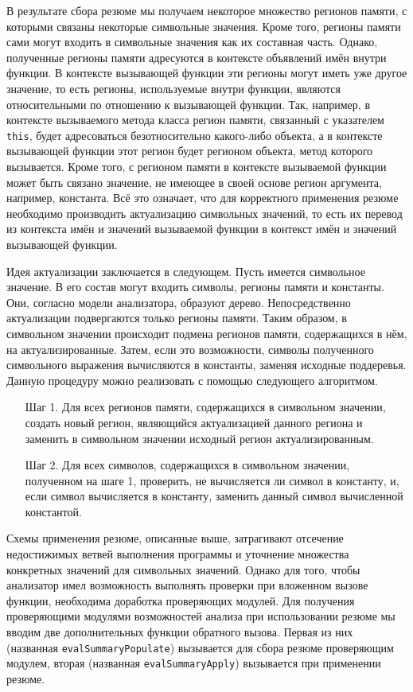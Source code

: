В результате сбора резюме мы получаем некоторое множество регионов памяти, с которыми связаны некоторые символьные значения. Кроме того, регионы памяти сами могут входить в символьные значения как их составная часть. Однако, полученные регионы памяти адресуются в контексте объявлений имён внутри функции. В контексте вызывающей функции эти регионы могут иметь уже другое значение, то есть регионы, используемые внутри функции, являются относительными по отношению к вызывающей функции. Так, например, в контексте вызываемого метода класса регион памяти, связанный с указателем \texttt{this}, будет адресоваться безотносительно какого-либо объекта, а в контексте вызывающей функции этот регион будет регионом объекта, метод которого вызывается. Кроме того, с регионом памяти в контексте вызываемой функции может быть связано значение, не имеющее в своей основе регион аргумента, например, константа. Всё это означает, что для корректного применения резюме необходимо производить актуализацию символьных значений, то есть их перевод из контекста имён и значений вызываемой функции в контекст имён и значений вызывающей функции.

Идея актуализации заключается в следующем. Пусть имеется символьное значение. В его состав могут входить символы, регионы памяти и константы. Они, согласно модели анализатора, образуют дерево. Непосредственно актуализации подвергаются только регионы памяти. Таким образом, в символьном значении происходит подмена регионов памяти, содержащихся в нём, на актуализированные. Затем, если это возможности, символы полученного символьного выражения вычисляются в константы, заменяя исходные поддеревья. Данную процедуру можно реализовать с помощью следующего алгоритмом.

\begin{enumerate}
 \item[Шаг 1.] Для всех регионов памяти, содержащихся в символьном значении, создать новый регион, являющийся актуализацией данного региона и заменить в символьном значении исходный регион актуализированным.
 \item[Шаг 2.] Для всех символов, содержащихся в символьном значении, полученном на шаге 1, проверить, не вычисляется ли символ в константу, и, если символ вычисляется в константу, заменить данный символ вычисленной константой.
\end{enumerate}

Схемы применения резюме, описанные выше, затрагивают отсечение недостижимых ветвей выполнения программы и уточнение множества конкретных значений для символьных значений. Однако для того, чтобы анализатор имел возможность выполнять проверки при вложенном вызове функции, необходима доработка проверяющих модулей. Для получения проверяющими модулями возможностей анализа при использовании резюме мы вводим две дополнительных функции обратного вызова. Первая из них (названная \texttt{evalSummaryPopulate}) вызывается для сбора резюме проверяющим модулем, вторая (названная \texttt{evalSummaryApply}) вызывается при применении резюме.

